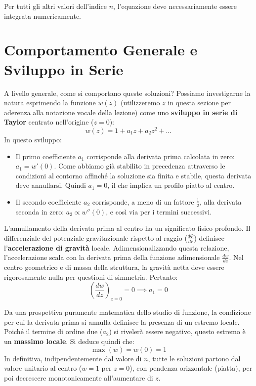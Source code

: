 Per tutti gli altri valori dell'indice $n$, l'equazione deve necessariamente essere integrata numericamente.

\section{Comportamento Generale e Sviluppo in Serie}

A livello generale, come si comportano queste soluzioni?
Possiamo investigarne la natura esprimendo la funzione $w(z)$ (utilizzeremo $z$ in questa sezione per aderenza alla notazione vocale della lezione) come uno \textbf{sviluppo in serie di Taylor} centrato nell'origine ($z=0$):
\begin{equation}
w(z) = 1 + a_1 z + a_2 z^2 + \dots
\end{equation}
In questo sviluppo:
\begin{itemize}
\item Il primo coefficiente $a_1$ corrisponde alla derivata prima calcolata in zero: $a_1 = w'(0)$. Come abbiamo già stabilito in precedenza attraverso le condizioni al contorno affinché la soluzione sia finita e stabile, questa derivata deve annullarsi. Quindi $a_1 = 0$, il che implica un profilo piatto al centro.
\item Il secondo coefficiente $a_2$ corrisponde, a meno di un fattore $\frac{1}{2}$, alla derivata seconda in zero: $a_2 \propto w''(0)$, e così via per i termini successivi.
\end{itemize}

L'annullamento della derivata prima al centro ha un significato fisico profondo. Il differenziale del potenziale gravitazionale rispetto al raggio ($\frac{d\Phi}{dr}$) definisce l'\textbf{accelerazione di gravità} locale. Adimensionalizzando questa relazione, l'accelerazione scala con la derivata prima della funzione adimensionale $\frac{dw}{dz}$.
Nel centro geometrico e di massa della struttura, la gravità netta deve essere rigorosamente nulla per questioni di simmetria. Pertanto:
\begin{equation}
\left( \frac{dw}{dz} \right)_{z=0} = 0 \implies a_1 = 0
\end{equation}

Da una prospettiva puramente matematica dello studio di funzione, la condizione per cui la derivata prima si annulla definisce la presenza di un estremo locale. Poiché il termine di ordine due ($a_2$) si rivelerà essere negativo, questo estremo è un \textbf{massimo locale}.
Si deduce quindi che:
\begin{equation}
\max(w) = w(0) = 1
\end{equation}
In definitiva, indipendentemente dal valore di $n$, tutte le soluzioni partono dal valore unitario al centro ($w=1$ per $z=0$), con pendenza orizzontale (piatta), per poi decrescere monotonicamente all'aumentare di $z$.

